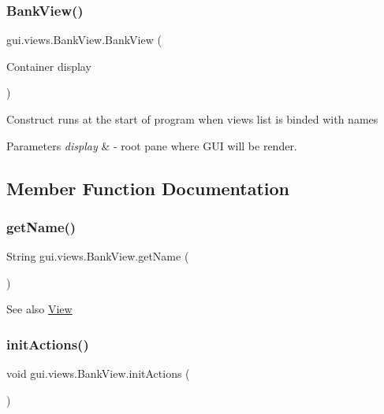\subsubsection{\texorpdfstring{Bank\+View()}{BankView()}}
{\footnotesize\ttfamily gui.\+views.\+Bank\+View.\+Bank\+View (\begin{DoxyParamCaption}\item[{Container}]{display }\end{DoxyParamCaption})\hspace{0.3cm}{\ttfamily [inline]}}

Construct runs at the start of program when views list is binded with names 
\begin{DoxyParams}{Parameters}
{\em display} & -\/ root pane where G\+UI will be render. \\
\hline
\end{DoxyParams}


\subsection{Member Function Documentation}
\mbox{\label{classgui_1_1views_1_1_bank_view_ac5a8f5a66514f19790341a4ebfa8afa7}} 
\subsubsection{\texorpdfstring{get\+Name()}{getName()}}
{\footnotesize\ttfamily String gui.\+views.\+Bank\+View.\+get\+Name (\begin{DoxyParamCaption}{ }\end{DoxyParamCaption})\hspace{0.3cm}{\ttfamily [inline]}}

\begin{DoxySeeAlso}{See also}
\mbox{\hyperlink{classgui_1_1views_1_1_view}{View}} 
\end{DoxySeeAlso}
\mbox{\label{classgui_1_1views_1_1_bank_view_a4e7ef9c3f0d99d799c09bc8a1c555ae0}} 
\subsubsection{\texorpdfstring{init\+Actions()}{initActions()}}
{\footnotesize\ttfamily void gui.\+views.\+Bank\+View.\+init\+Actions (\begin{DoxyParamCaption}{ }\end{DoxyParamCaption})\hspace{0.3cm}{\ttfamily [inline]}}

